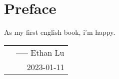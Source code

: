 \thispagestyle{empty}
\chapter*{Preface}
As my first english book, i'm happy.

\hfill
\begin{tabular}{lr}
    &----- Ethan Lu\\ 
    &2023-01-11
\end{tabular}

\begin{center}
    \vfill
    \thepage
\end{center}
\let\cleardoublepage\clearpage
